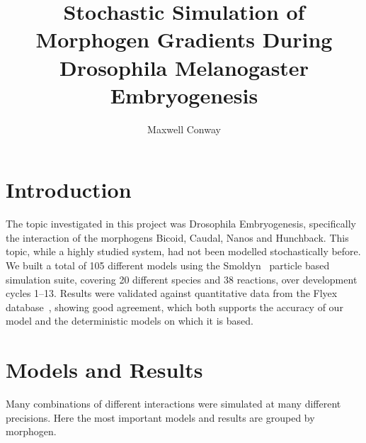 \documentclass[11pt,a4paper,twocolumn]{article}
\begin{document}
\title{\vspace{-2em}Stochastic Simulation of Morphogen Gradients During Drosophila Melanogaster Embryogenesis\vspace{-10pt}}
\author{Maxwell Conway}
\date{\vspace{-30pt}}
\maketitle
\section{Introduction}
The topic investigated in this project was Drosophila Embryogenesis, specifically the interaction of the morphogens Bicoid, Caudal, Nanos and Hunchback. This topic, while a highly studied system, had not been modelled stochastically before. We built a total of 105 different models using the Smoldyn~\cite{Andrews2010} particle based simulation suite, covering 20 different species and 38 reactions, over development cycles 1--13. Results were validated against quantitative data from the Flyex database~\cite{Pisarev2009}, showing good agreement, which both supports the accuracy of our model and the deterministic models on which it is based. 

\section{Models and Results}
Many combinations of different interactions were simulated at many different precisions. Here the most important models and results are grouped by morphogen.
\end{document}
